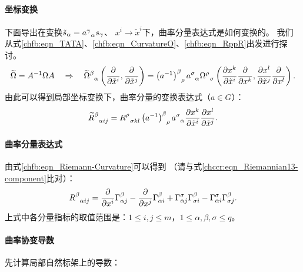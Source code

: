 \paragraph{坐标变换} 下面导出在变换$\tilde{s}_\alpha=a_{\hphantom{\alpha}\alpha}^\gamma s_\gamma$、
$x^i\to \tilde{x}^i$下，曲率分量表达式是如何变换的。
我们从式\eqref{chfb:eqn_TATA}、\eqref{chfb:eqn_CurvatureO}、\eqref{chfb:eqn_RppR}出发进行探讨。
\begin{align*}
	\widetilde{\Omega} =A^{-1} \Omega A \quad \Rightarrow \quad 
	\widetilde{\Omega}_{\hphantom{\alpha}\alpha}^\beta
	\left( \frac{\partial }{\partial \tilde{x}^i}, \frac{\partial }{\partial \tilde{x}^j} \right) 
	=\left(a^{-1}\right)_{\hphantom{\alpha}\rho}^\beta a_{\hphantom{\alpha}\alpha}^\sigma 
	\Omega_{\hphantom{\alpha}\sigma}^\rho
	\left( \frac{\partial x^k }{\partial \tilde{x}^i} \frac{\partial }{\partial x^k}, 
	\frac{\partial x^l }{\partial \tilde{x}^j} \frac{\partial }{\partial x^l} \right) .
\end{align*}
由此可以得到局部坐标变换下，曲率分量的变换表达式（$a\in G$）：
\begin{equation}\label{chfb:eqn_Rvb-trans}
	\widetilde{R}^\beta_{\hphantom{\alpha}\alpha ij}
	= R^\rho_{\hphantom{\alpha}\sigma kl} 
	\left(a^{-1}\right)_{\hphantom{\alpha}\rho}^\beta a_{\hphantom{\alpha}\alpha}^\sigma
	\frac{\partial x^k }{\partial \tilde{x}^i} \frac{\partial x^l }{\partial \tilde{x}^j} .
\end{equation}


\paragraph{曲率分量表达式} 由式\eqref{chfb:eqn_Riemann-Curvature}可以得到
（请与式\eqref{chccr:eqn_Riemannian13-component}比对）：
\begin{equation}\label{chfb:eqn_R-vector-bundle}
	R_{\hphantom{\alpha}\alpha i j}^\beta 
	= \frac{\partial}{\partial x^i} \Gamma_{\alpha j}^{\beta} 
	-\frac{\partial}{\partial x^j} \Gamma_{\alpha i}^{\beta}
	+\Gamma_{\alpha j}^{\sigma} \Gamma_{\sigma i}^{\beta} 
	-  \Gamma_{\alpha i}^{\sigma}\Gamma_{\sigma j}^{\beta} .   
\end{equation}
上式中各分量指标的取值范围是：$ 1\leqslant i,j \leqslant m $，$ 1\leqslant \alpha,\beta,\sigma \leqslant q$。



\paragraph{曲率协变导数} 先计算局部自然标架上的导数：

